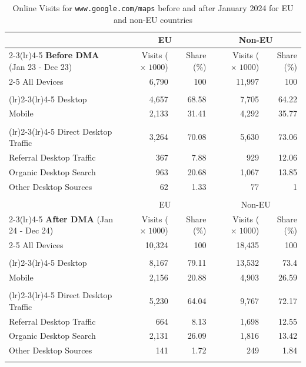 \documentclass[11pt]{article}
\begin{document}
	
	\begin{table}[!ht]
		\centering
		\def\sym#1{\ifmmode^{#1}\else\(^{#1}\)\fi}
		\caption{\label{tab:sum_stat_traffic} Online Visits for \texttt{www.google.com/maps} before and after January 2024 for EU and non-EU countries} 
		\begin{threeparttable}
			\begin{tabular}{lrrrr}
				\bottomrule \noalign{\smallskip} 
				& \multicolumn{2}{c}{EU} & \multicolumn{2}{c}{Non-EU}  \\ \cmidrule(lr){2-3}\cmidrule(lr){4-5}
				\textbf{Before DMA }\;(Jan 23 - Dec 23)		& Visits ($\times \; 1000$) & Share (\%) & Visits ($\times \; 1000$) & Share (\%)  \\ \cmidrule(lr){2-5}
				All Devices&6,790&100&11,997&100 \tabularnewline \vspace{-10pt} \\ 
				\noalign{\smallskip} \cmidrule(lr){2-3}\cmidrule(lr){4-5}
				Desktop&4,657&68.58&7,705&64.22 \tabularnewline
				Mobile&2,133&31.41&4,292&35.77 \tabularnewline \vspace{-10pt} \\ 
				\noalign{\smallskip} \cmidrule(lr){2-3}\cmidrule(lr){4-5}
				Direct Desktop Traffic&3,264&70.08&5,630&73.06 \tabularnewline
				Referral Desktop Traffic&367&7.88&929&12.06 \tabularnewline
				Organic Desktop Search&963&20.68&1,067&13.85 \tabularnewline
				Other Desktop Sources&62&1.33&77&1 \tabularnewline \vspace{-10pt} \\ 
				\toprule  
				& \multicolumn{2}{c}{EU} & \multicolumn{2}{c}{Non-EU}  \\ \cmidrule(lr){2-3}\cmidrule(lr){4-5}
				\textbf{After DMA }\;(Jan 24 - Dec 24)		& Visits ($\times \; 1000$) & Share (\%) & Visits ($\times \; 1000$) & Share (\%)  \\ \cmidrule(lr){2-5}
				All Devices&10,324&100&18,435&100 \tabularnewline \vspace{-10pt} \\ 
				\noalign{\smallskip} \cmidrule(lr){2-3}\cmidrule(lr){4-5}
				Desktop&8,167&79.11&13,532&73.4 \tabularnewline
				Mobile&2,156&20.88&4,903&26.59 \tabularnewline \vspace{-10pt} \\ 
				\noalign{\smallskip} \cmidrule(lr){2-3}\cmidrule(lr){4-5}
				Direct Desktop Traffic&5,230&64.04&9,767&72.17 \tabularnewline
				Referral Desktop Traffic&664&8.13&1,698&12.55 \tabularnewline
				Organic Desktop Search&2,131&26.09&1,816&13.42 \tabularnewline
				Other Desktop Sources&141&1.72&249&1.84 \tabularnewline \vspace{-10pt} \\ 
				\bottomrule 
			\end{tabular}
			

\end{threeparttable}
\end{table}
\end{document}
